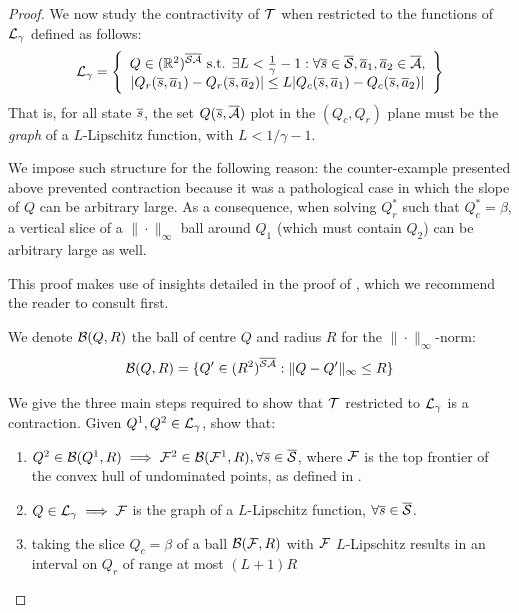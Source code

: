 \begin{proof}
We now study the contractivity of $\mathcal{T}$ when restricted to the functions of $\mathcal{L}_\gamma$ defined as follows:
\begin{equation}
    \mathcal{L}_\gamma = \left\{\begin{array}{cc}
         Q\in(\mathbb{R}^2)^{\overline{\mathcal{S}}\overline{\mathcal{A}}}\text{ s.t. }\exists L<\frac{1}{\gamma}-1: \forall \overline{s}\in\overline{\mathcal{S}},\overline{a}_1,\overline{a}_2\in\overline{\mathcal{A}},   \\
         |Q_r(\overline{s},\overline{a}_1) - Q_r(\overline{s},\overline{a}_2)| \leq L|Q_c(\overline{s},\overline{a}_1) - Q_c(\overline{s},\overline{a}_2)|
    \end{array}\right\}
\end{equation}
That is, for all state $\overline{s}$, the set $Q(\overline{s}, \overline{\mathcal{A}})$ plot in the $(Q_c,Q_r)$ plane must be the \emph{graph} of a $L$-Lipschitz function, with $L<1/\gamma-1$.

We impose such structure for the following reason: the counter-example presented above prevented contraction because it was a pathological case in which the slope of $Q$ can be arbitrary large. As a consequence, when solving $Q_r^*$ such that $Q_c^*=\beta$, a vertical slice of a $\|\cdot\|_\infty$ ball around $Q_1$ (which must contain $Q_2$) can be arbitrary large as well.

This proof makes use of insights detailed in the proof of , which we recommend the reader to consult first.

We denote $\mathcal{B}(Q,R)$ the ball of centre $Q$ and radius $R$ for the $\|\cdot\|_\infty$-norm:
\begin{equation*}
    \mathcal{B}(Q,R) = \{Q'\in(R^2)^{\overline{\mathcal{S}}\overline{\mathcal{A}}}: \|Q-Q'\|_\infty \leq R\}
\end{equation*}

We give the three main steps required to show that $\mathcal{T}$ restricted to $\mathcal{L}_\gamma$ is a contraction. Given $Q^1, Q^2\in\mathcal{L}_\gamma$, show that:
\begin{enumerate}
    \item $Q^2\in\mathcal{B}(Q^1,R)\implies\mathcal{F}^2\in\mathcal{B}(\mathcal{F}^1, R), \forall\overline{s}\in\overline{\mathcal{S}}$, where $\mathcal{F}$ is the top frontier of the convex hull of undominated points, as defined in .
    \item $Q\in\mathcal{L}_\gamma \implies \mathcal{F}$ is the graph of a $L$-Lipschitz function, $\forall\overline{s}\in\overline{\mathcal{S}}$.
    \item taking the slice $Q_c=\beta$ of a ball $\mathcal{B}(\mathcal{F},R)$ with $\mathcal{F}$ $L$-Lipschitz results in an interval on $Q_r$ of range at most $(L+1)R$
\end{enumerate}


\end{proof}
